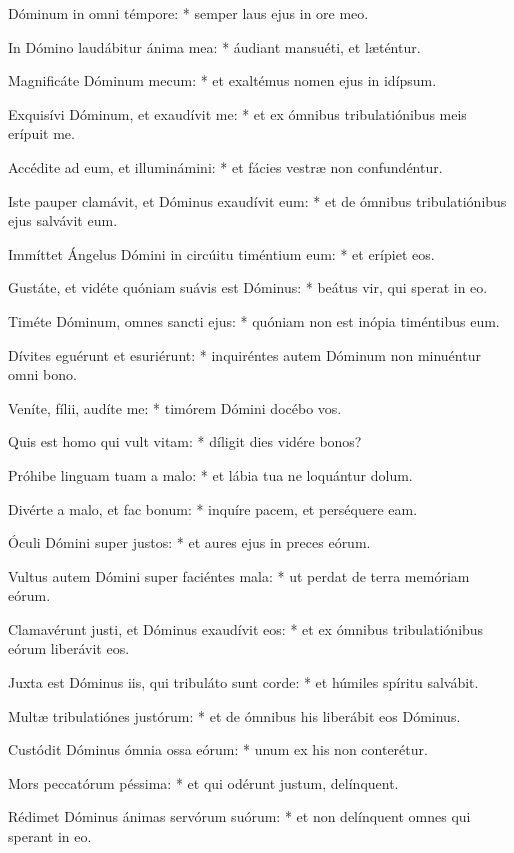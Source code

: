 \begin{psalmus}
    
     Dóminum in omni témpore: * semper laus ejus in ore meo.
    
    In Dómino laudábitur ánima mea: * áudiant mansuéti, et læténtur.
    
    Magnificáte Dóminum mecum: * et exaltémus nomen ejus in idípsum.
    
    Exquisívi Dóminum, et exaudívit me: * et ex ómnibus tribulatiónibus meis erípuit me.
    
    Accédite ad eum, et illuminámini: * et fácies vestræ non confundéntur.
    
    Iste pauper clamávit, et Dóminus exaudívit eum: * et de ómnibus tribulatiónibus ejus salvávit eum.
    
    Immíttet Ángelus Dómini in circúitu timéntium eum: * et erípiet eos.
    
    Gustáte, et vidéte quóniam suávis est Dóminus: * beátus vir, qui sperat in eo.
    
    Timéte Dóminum, omnes sancti ejus: * quóniam non est inópia timéntibus eum.
    
    Dívites eguérunt et esuriérunt: * inquiréntes autem Dóminum non minuéntur omni bono.
    
    Veníte, fílii, audíte me: * timórem Dómini docébo vos.
    
    Quis est homo qui vult vitam: * díligit dies vidére bonos?
    
    Próhibe linguam tuam a malo: * et lábia tua ne loquántur dolum.
    
    Divérte a malo, et fac bonum: * inquíre pacem, et perséquere eam.
    
    Óculi Dómini super justos: * et aures ejus in preces eórum.
    
    Vultus autem Dómini super faciéntes mala: * ut perdat de terra memóriam eórum.
    
    Clamavérunt justi, et Dóminus exaudívit eos: * et ex ómnibus tribulatiónibus eórum liberávit eos.
    
    Juxta est Dóminus iis, qui tribuláto sunt corde: * et húmiles spíritu salvábit.
    
    Multæ tribulatiónes justórum: * et de ómnibus his liberábit eos Dóminus.
    
    Custódit Dóminus ómnia ossa eórum: * unum ex his non conterétur.
    
    Mors peccatórum péssima: * et qui odérunt justum, delínquent.
    
    Rédimet Dóminus ánimas servórum suórum: * et non delínquent omnes qui sperant in eo.
    
    \end{psalmus}
